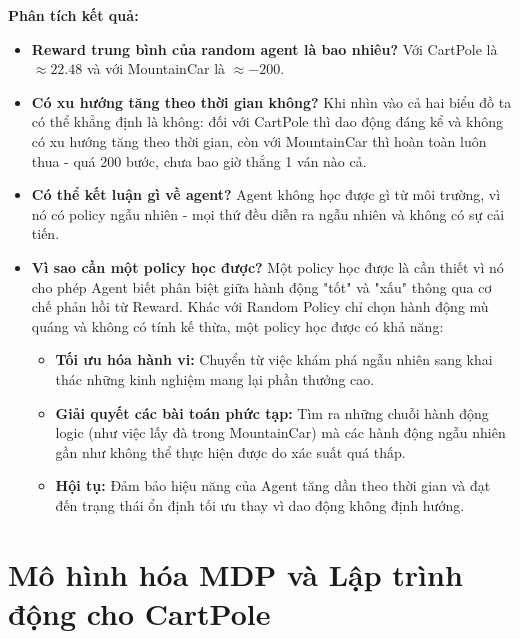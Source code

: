 \textbf{Phân tích kết quả:}
\begin{itemize}
    \item \textbf{Reward trung bình của random agent là bao nhiêu?} Với CartPole là $\approx 22.48$ và với MountainCar là $\approx -200$.
    \item \textbf{Có xu hướng tăng theo thời gian không?} Khi nhìn vào cả hai biểu đồ ta có thể khẳng định là không: đối với CartPole thì dao động đáng kể và không có xu hướng tăng theo thời gian, còn với MountainCar thì hoàn toàn luôn thua - quá 200 bước, chưa bao giờ thắng 1 ván nào cả.
    \item \textbf{Có thể kết luận gì về agent?} Agent không học được gì từ môi trường, vì nó có policy ngẫu nhiên - mọi thứ đều diễn ra ngẫu nhiên và không có sự cải tiến.
    \item \textbf{Vì sao cần một policy học được?} 
    Một policy học được là cần thiết vì nó cho phép Agent biết phân biệt giữa hành động "tốt" và "xấu" thông qua cơ chế phản hồi từ Reward. Khác với Random Policy chỉ chọn hành động mù quáng và không có tính kế thừa, một policy học được có khả năng:
    \begin{itemize}
        \item \textbf{Tối ưu hóa hành vi:} Chuyển từ việc khám phá ngẫu nhiên sang khai thác những kinh nghiệm mang lại phần thưởng cao.
        \item \textbf{Giải quyết các bài toán phức tạp:} Tìm ra những chuỗi hành động logic (như việc lấy đà trong MountainCar) mà các hành động ngẫu nhiên gần như không thể thực hiện được do xác suất quá thấp.
        \item \textbf{Hội tụ:} Đảm bảo hiệu năng của Agent tăng dần theo thời gian và đạt đến trạng thái ổn định tối ưu thay vì dao động không định hướng.
    \end{itemize}
\end{itemize}

\section{Mô hình hóa MDP và Lập trình động cho CartPole}
